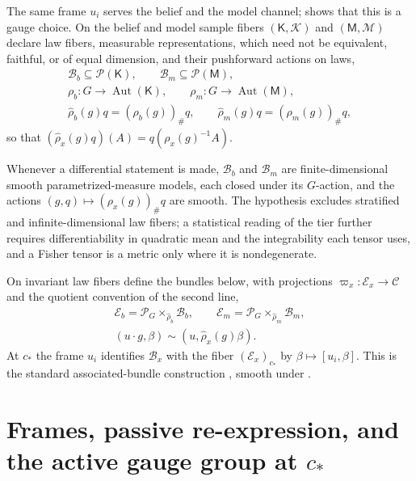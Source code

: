 The same frame $u_i$ serves the belief and the model channel; 
shows that this is a gauge choice. On the belief and model sample fibers $(\mathsf K,\mathscr K)$ and
$(\mathsf M,\mathscr M)$ declare law fibers, measurable representations, which need not be equivalent,
faithful, or of equal dimension, and their pushforward actions on laws,
\begin{gather}
\mathcal B_b\subseteq\mathcal P(\mathsf K),
\qquad
\mathcal B_m\subseteq\mathcal P(\mathsf M),
\label{eq:geo-law-fibers}\\
\rho_b:G\longrightarrow\operatorname{Aut}(\mathsf K),
\qquad
\rho_m:G\longrightarrow\operatorname{Aut}(\mathsf M),
\label{eq:geo-representations}\\
\widehat\rho_b(g)q=(\rho_b(g))_\#q,
\qquad
\widehat\rho_m(g)q=(\rho_m(g))_\#q,
\label{eq:geo-pushforward-actions}
\end{gather}
so that $(\widehat\rho_x(g)q)(A)=q(\rho_x(g)^{-1}A)$.

Whenever a differential statement is made, $\mathcal B_b$ and $\mathcal B_m$ are finite-dimensional
smooth parametrized-measure models, each closed under its $G$-action, and the actions
$(g,q)\mapsto(\rho_x(g))_\#q$\label{eq:geo-smooth-actions} are smooth. The hypothesis excludes
stratified and infinite-dimensional law fibers; a statistical reading of the tier further requires
differentiability in quadratic mean and the integrability each tensor uses, and a Fisher tensor is a
metric only where it is nondegenerate.

On invariant law fibers define the bundles below, with projections $\varpi_x:\mathcal E_x\to\mathcal C$
and the quotient convention of the second line,
\begin{gather}
\mathcal E_b=\mathscr P_G\times_{\widehat\rho_b}\mathcal B_b,
\qquad
\mathcal E_m=\mathscr P_G\times_{\widehat\rho_m}\mathcal B_m,
\label{eq:geo-associated-bundles}\\
(u\cdot g,\beta)\sim(u,\widehat\rho_x(g)\beta).
\label{eq:geo-quotient-convention}
\end{gather}
At $c_*$ the frame $u_i$ identifies $\mathcal B_x$ with the fiber $(\mathcal E_x)_{c_*}$ by
$\beta\mapsto[u_i,\beta]$. This is the standard associated-bundle construction
\citep[Section~I.5]{Kobayashi1963}, smooth under .

\section{Frames, passive re-expression, and the active gauge group at \texorpdfstring{$c_*$}{c*}}
\label{sec:geo-frame-gauge}

